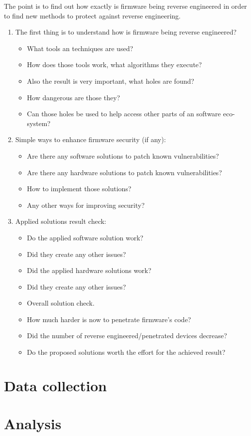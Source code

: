 \documentclass[]{report}
\begin{document}
The point is to find out how exactly is firmware being reverse engineered in order to find new methods to protect against reverse engineering.
\begin{enumerate}
	\item The first thing is to understand how is firmware being reverse engineered? 
 	\begin{itemize}
 	\item What tools an techniques are used? 
 	\item How does those tools work, what algorithms they execute? 
 	\item Also the result is very important, what holes are found? 
 	\item How dangerous are those they? 
 	\item Can those holes be used to help access other parts of an software eco-system?
 	\end{itemize}

	\item Simple ways to enhance firmware security (if any):
	\begin{itemize}
	\item Are there any software solutions to patch known vulnerabilities?
	\item Are there any hardware solutions to patch known vulnerabilities?
	\item How to implement those solutions?
	\item Any other ways for improving security?
	\end{itemize}

\item Applied solutions result check:
\begin{itemize}
 \item Do the applied software solution work?
\item Did they create any other issues?
\item Did the applied hardware solutions work?
\item Did they create any other issues?
\item Overall solution check.
\item How much harder is now to penetrate firmware's code?
\item Did the number of reverse engineered/penetrated devices decrease?
\item Do the proposed solutions worth the effort for the achieved result?
\end{itemize}
\end{enumerate}
\section{Data collection}
\section{Analysis}
\end{document}
